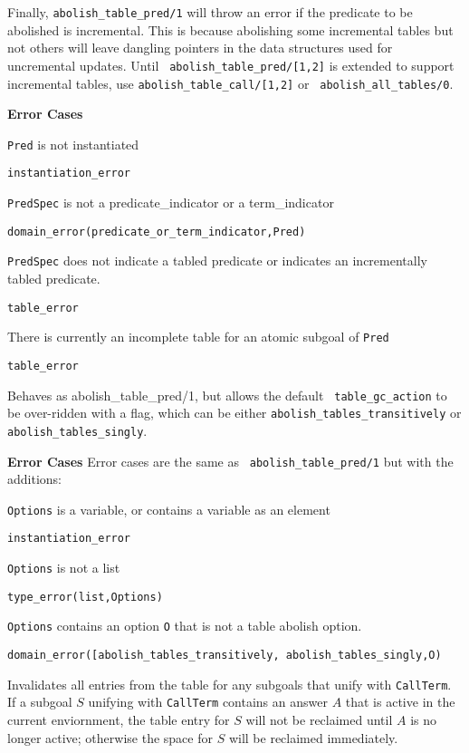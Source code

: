 \begin{description}
\begin{description}
Finally, {\tt abolish\_table\_pred/1} will throw an error if the
predicate to be abolished is incremental.  This is because abolishing
some incremental tables but not others will leave dangling pointers in
the data structures used for uncremental updates.  Until {\tt
  abolish\_table\_pred/[1,2]} is extended to support incremental
tables, use {\tt abolish\_table\_call/[1,2]} or {\tt
  abolish\_all\_tables/0}.

{\bf Error Cases}
\bi
%
\item {\tt Pred} is not instantiated
 \bi 
 \item 	{\tt instantiation\_error}
 \ei
%
\item {\tt PredSpec} is not a predicate\_indicator or a term\_indicator
 \bi
 \item 	{\tt domain\_error(predicate\_or\_term\_indicator,Pred)}
 \ei
%
\item {\tt PredSpec} does not indicate a tabled predicate or indicates
  an incrementally tabled predicate.
  \bi
 \item 	{\tt table\_error}
 \ei
%
\item There is currently an incomplete table for an atomic subgoal of
  {\tt Pred}
 \bi
 \item 	{\tt table\_error}
 \ei
%
\ei

%
Behaves as {abolish\_table\_pred/1}, but allows the default {\tt
  table\_gc\_action} to be over-ridden with a flag, which can be either 
{\tt abolish\_tables\_transitively} or {\tt abolish\_tables\_singly}.

{\bf Error Cases} Error cases are the same as {\tt
  abolish\_table\_pred/1} but with the additions: 
\bi
\item {\tt Options} is a variable, or contains a variable as an element
\bi
\item {\tt instantiation\_error}
\ei
\item {\tt Options} is not a list
\bi
\item {\tt type\_error(list,Options)}
\ei
\item {\tt Options} contains an option {\tt O} that is not a
  table abolish option.
\bi
\item {\tt domain\_error([abolish\_tables\_transitively, abolish\_tables\_singly,O)}
\ei
\ei

%
Invalidates all entries from the table for any subgoals that unify
with {\tt CallTerm}.  If a subgoal $S$ unifying with {\tt CallTerm}
contains an answer $A$ that is active in the current enviornment, the
table entry for $S$ will not be reclaimed until $A$ is no longer
active; otherwise the space for $S$ will be reclaimed immediately.


\end{description}
\end{description}
